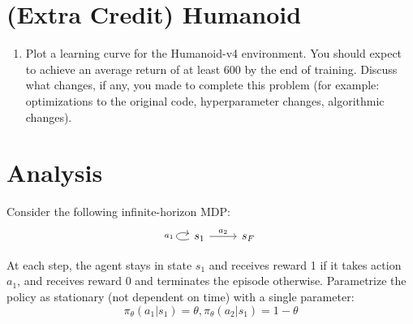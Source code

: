 \documentclass{article}
\begin{document}
\newpage\section{(Extra Credit) Humanoid}
\begin{enumerate}
    \item Plot a learning curve for the Humanoid-v4 environment. You should expect to achieve an average return of at least 600 by the end of training. Discuss what changes, if any, you made to complete this problem (for example: optimizations to the original code, hyperparameter changes, algorithmic changes).
\end{enumerate}

\newpage\section{Analysis}
\label{sec:analysis}
Consider the following infinite-horizon MDP:
\[\begin{tikzcd}
	s_1 & {s_F}
	\arrow["{a_2}", from=1-1, to=1-2]
    \arrow["{a_1}", loop left, from=1-1, to=1-1]
\end{tikzcd}\]
\newcommand{\Rmax}[0]{R_{\textrm{max}}}
\newcommand{\E}[0]{\mathbb{E}}
\newcommand{\var}[0]{\textrm{Var}}
\newcommand\question[1][]{\item\refstepcounter{subsection}\label[question]{#1}}

At each step, the agent stays in state $s_1$ and receives reward 1 if it takes action $a_1$, and receives reward 0 and terminates the episode otherwise.
Parametrize the policy as stationary (not dependent on time) with a single parameter:
\[\pi_\theta(a_1|s_1) = \theta, \pi_\theta(a_2|s_1) = 1-\theta\]
\end{document}
